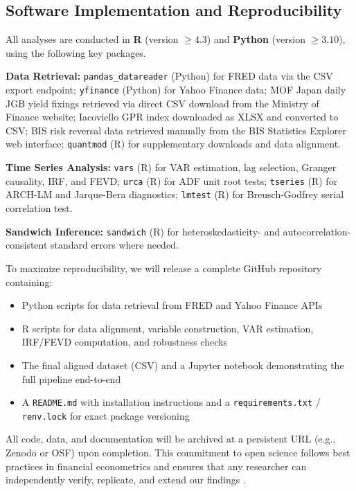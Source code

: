 \documentclass[12pt]{article}
\begin{document}
\subsection{Software Implementation and Reproducibility}

{} All analyses are conducted in \textbf{R} (version $\ge 4.3$) and \textbf{Python} (version $\ge 3.10$), using the following key packages.

\textbf{Data Retrieval:} \texttt{pandas\_datareader} (Python) for FRED data via the CSV export endpoint; \texttt{yfinance} (Python) for Yahoo Finance data; MOF Japan daily JGB yield fixings retrieved via direct CSV download from the Ministry of Finance website; Iacoviello GPR index downloaded as XLSX and converted to CSV; BIS risk reversal data retrieved manually from the BIS Statistics Explorer web interface; \texttt{quantmod} (R) for supplementary downloads and data alignment.

\textbf{Time Series Analysis:} \texttt{vars} (R) for VAR estimation, lag selection, Granger causality, IRF, and FEVD; \texttt{urca} (R) for ADF unit root tests; \texttt{tseries} (R) for ARCH-LM and Jarque-Bera diagnostics; \texttt{lmtest} (R) for Breusch-Godfrey serial correlation test.

\textbf{Sandwich Inference:} \texttt{sandwich} (R) for heteroskedasticity- and autocorrelation-consistent standard errors where needed.

{} To maximize reproducibility, we will release a complete GitHub repository containing:
\begin{itemize}
  \item Python scripts for data retrieval from FRED and Yahoo Finance APIs
  \item R scripts for data alignment, variable construction, VAR estimation, IRF/FEVD computation, and robustness checks
  \item The final aligned dataset (CSV) and a Jupyter notebook demonstrating the full pipeline end-to-end
  \item A \texttt{README.md} with installation instructions and a \texttt{requirements.txt} / \texttt{renv.lock} for exact package versioning
\end{itemize}

{} All code, data, and documentation will be archived at a persistent URL (e.g., Zenodo or OSF) upon completion. This commitment to open science follows best practices in financial econometrics and ensures that any researcher can independently verify, replicate, and extend our findings \parencite{rossi2013exchange}.

\newpage
\printbibliography[title={References}]
\end{document}
